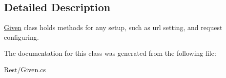 \subsection{Detailed Description}
\hyperlink{class_proto_test_1_1_golem_1_1_rest_1_1_given}{Given} class holds methods for any setup, such as url setting, and request configuring. 



The documentation for this class was generated from the following file\-:\begin{DoxyCompactItemize}
\item 
Rest/Given.\-cs\end{DoxyCompactItemize}

